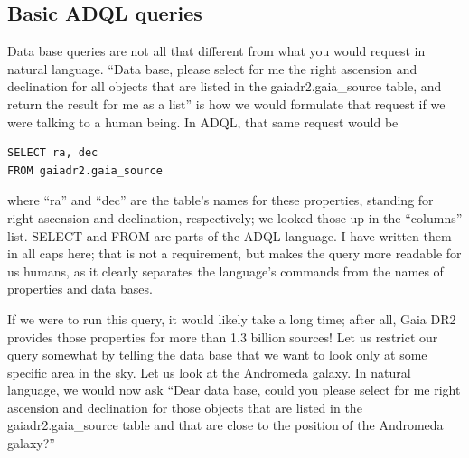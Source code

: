 \documentclass[twocolumn,apj]{openjournal}
\begin{document}
\subsection{Basic ADQL queries}
\label{BasicADQL}

Data base queries are not all that different from what you would request in natural language. ``Data base, please select for me the right ascension and declination for all objects that are listed in the gaiadr2.gaia\_source table, and return the result for me as a list'' is how we would formulate that request if we were talking to a human being. In ADQL, that same request would be
\begin{lstlisting}
SELECT ra, dec
FROM gaiadr2.gaia_source
\end{lstlisting}
where ``ra'' and ``dec'' are the table's names for these properties, standing for right ascension and declination, respectively; we looked those up in the ``columns'' list. SELECT and FROM are parts of the ADQL language. I have written them in all caps here; that is not a requirement, but makes the query more readable for us humans, as it clearly separates the language's commands from the names of properties and data bases.

If we were to run this query, it would likely take a long time; after all, Gaia DR2 provides those properties for more than 1.3 billion sources! Let us restrict our query somewhat by telling the data base that we want to look only at some specific area in the sky. Let us look at the Andromeda galaxy. In natural language, we would now ask ``Dear data base, could you please select for me right ascension and declination for those objects that are listed in the gaiadr2.gaia\_source table and that are close to the position of the Andromeda galaxy?''
\end{document}
